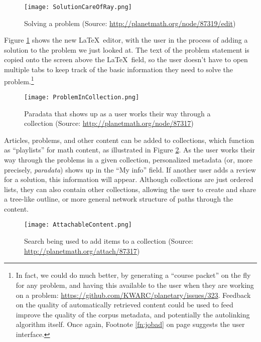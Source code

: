 \documentclass[12pt]{article}
\begin{document}
\begin{figure}[h]
\begin{center}
\texttt{[image: SolutionCareOfRay.png]}
\end{center}
\caption{Solving a problem (Source: \url{http://planetmath.org/node/87319/edit}) \label{SolutionCareOfRay}}
\end{figure}

Figure \ref{SolutionCareOfRay} shows the new \LaTeX\ editor, with the
user in the process of adding a solution to the problem we just looked
at.  The text of the problem statement is copied onto the screen above
the \LaTeX\ field, so the user doesn't have to open multiple tabs to
keep track of the basic information they need to solve the
problem.\footnote{\label{fn:course-packet}In fact, we could do much
  better, by generating a ``course packet'' on the fly for any
  problem, and having this available to the user when they are working
  on a problem: \url{https://github.com/KWARC/planetary/issues/323}.
  Feedback on the quality of automatically retrieved content could be
  used to feed improve the quality of the corpus metadata, and
  potentially the autolinking algorithm itself.  Once again, Footnote
  \ref{fn:jobad} on page \pageref{fn:jobad} suggests the user
  interface.}

\begin{figure}[h]
\begin{center}
\texttt{[image: ProblemInCollection.png]}
\end{center}
\caption{Paradata that shows up as a user works their way through a collection (Source: \url{http://planetmath.org/node/87317}) \label{ProblemInCollection}}
\end{figure}

Articles, problems, and other content can be added to collections, which function as ``playlists'' for math content, as illustrated in Figure \ref{ProblemInCollection}.  As the user works their way through the problems in a given collection, personalized metadata (or, more precisely, \emph{paradata}) shows up in the ``My info'' field.  If another user adds a review for a solution, this information will appear.  Although collections are just ordered lists, they can also contain other collections, allowing the user to create and share a tree-like outline, or more general network structure of paths through the content.

\begin{figure}[h]
\begin{center}
\texttt{[image: AttachableContent.png]}
\end{center}
\caption{Search being used to add items to a collection (Source: \url{http://planetmath.org/attach/87317})\label{AttachableContent}}
\end{figure}
\end{document}
